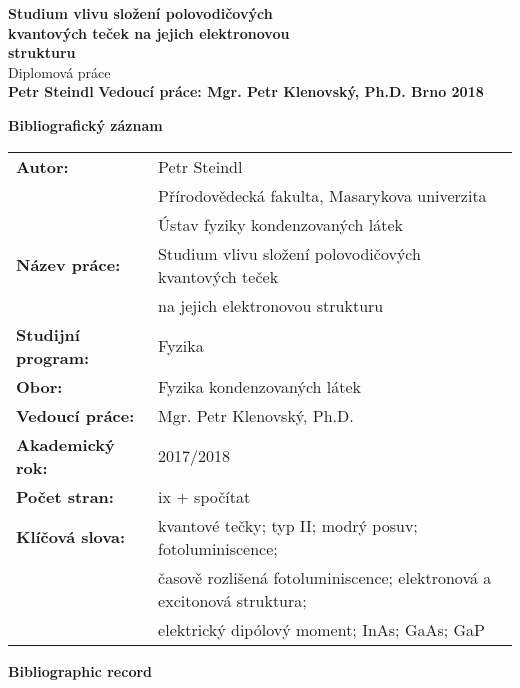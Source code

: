 \documentclass[
a4paper, %
11pt, %
onecolumn, %
openany, %
oldfontcommands,
]{memoir}
\begin{document}
\vspace{5cm}
\begingroup
\noindent %
\huge{\textbf{Studium vlivu složení polovodičových\\
		 kvantových teček na jejich elektronovou \\
		 strukturu}}
\vspace{0.5cm}\\
\Large{Diplomová práce}
\vspace{0.5cm}\\
\huge{\bfseries{Petr Steindl}}
\vfill
\noindent\normalsize\bfseries{Vedoucí práce: Mgr. Petr Klenovský, Ph.D. \hfill Brno 2018}
\endgroup

\newpage
\cleardoublepage
\Large\textbf{Bibliografický záznam}\\

\normalsize
\renewcommand{\arraystretch}{2}
\begin{tabular}{ll}
	\textbf{Autor:} & Petr Steindl\\[-0.5cm]
	& Přírodovědecká fakulta, Masarykova univerzita\\[-0.5cm]
	& Ústav fyziky kondenzovaných látek\\
	\textbf{Název práce:} & Studium vlivu složení polovodičových kvantových teček \\[-0.5cm]
	& na jejich elektronovou strukturu\\ 
	\textbf{Studijní program:}& Fyzika \\
	\textbf{Obor:}& Fyzika kondenzovaných látek \\
	\textbf{Vedoucí práce:}& Mgr. Petr Klenovský, Ph.D. \\
	\textbf{Akademický rok:}& 2017/2018 \\
	\textbf{Počet stran:}& ix + spočítat \\
	\textbf{Klíčová slova:}& kvantové tečky; typ II; modrý posuv; fotoluminiscence; \\[-0.5cm]
	&časově rozlišená fotoluminiscence; elektronová a excitonová struktura;\\[-0.5cm]
	& elektrický dipólový moment; InAs; GaAs; GaP \\
\end{tabular} 


\newpage
\cleardoublepage
\Large\textbf{Bibliographic record}\\
\end{document}
